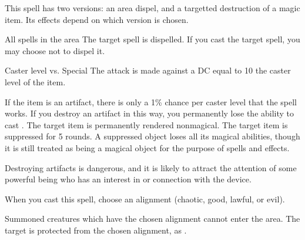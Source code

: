 \begin{spellheader}
    \spellspecial This spell has two versions: an area dispel, and a targetted destruction of a magic item. Its effects depend on which version is chosen.
\end{spellheader}
\begin{spelleffects}
    \begin{spellattack}{All spells in the area}
        \spelleffect The target spell is dispelled. If you cast the target spell, you may choose not to dispel it.
    \end{spellattack}
    \begin{spellattack}{Caster level vs. Special}
        \spellspecial The attack is made against a DC equal to 10 \add the caster level of the item.

        If the item is an artifact, there is only a 1\% chance per caster level that the spell works. If you destroy an artifact in this way, you permanently lose the ability to cast \spell.
        \spellsuccess The target item is permanently rendered nonmagical.
        \spellfailure The target item is suppressed for 5 rounds. A suppressed object loses all its magical abilities, though it is still treated as being a magical object for the purpose of spells and effects.
    \end{spellattack}
\end{spelleffects}
\begin{spellfooter}
    \spellnotes Destroying artifacts is dangerous, and it is likely to attract the attention of some powerful being who has an interest in or connection with the device.
\end{spellfooter}

\begin{spellheader}
    \spelldur{\durshort \dismissable}
    \spellspecial When you cast this spell, choose an alignment (chaotic, good, lawful, or evil).
\end{spellheader}
\begin{spelleffects}
    \spelleffect Summoned creatures which have the chosen alignment cannot enter the area.
    \spelleffect The target is protected from the chosen alignment, as .
\end{spelleffects}
\begin{spellfooter}

\end{spellfooter}

